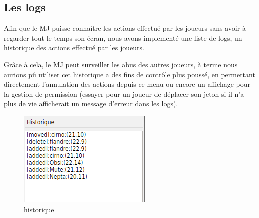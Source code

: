 \subsection{Les logs}

Afin que le MJ puisse connaître les actions effectué par les joueurs sans avoir à regarder tout le temps son écran, nous avons implementé une  liste de logs, un historique des actions effectué par les joueurs.

Grâce à cela, le MJ peut surveiller les abus des autres joueurs, à terme nous aurions pû utiliser cet historique a des fins de contrôle plus poussé, en permettant directement l'annulation des actions depuis ce menu ou encore un affichage pour la gestion de permission (essayer pour un joueur de déplacer son jeton si il n'a plus de vie afficherait un message d'erreur dans les logs).

\begin{figure}[h!]
    \centering
    \includegraphics[scale=0.7]{img/log.png}
    \caption{historique}
    \label{fig:log}
\end{figure}